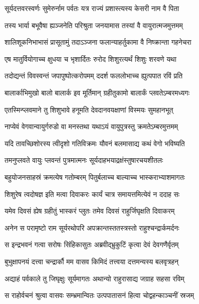 \twolineshloka
{सूर्यदत्तवरस्वर्णः सुमेरुर्नाम पर्वतः}
{यत्र राज्यं प्रशास्त्यस्य केसरी नाम वै पिता} %

\twolineshloka
{तस्य भार्या बभूवैषा ह्यञ्जनेति परिश्रुता}
{जनयामास तस्यां वै वायुरात्मजमुत्तमम्} %

\twolineshloka
{शालिशूकनिभाभासं प्रासूतामुं तदाऽञ्जना}
{फलान्याहर्तुकामा वै निष्क्रान्ता गहनेचरा} %

\twolineshloka
{एष मातुर्वियोगाच्च क्षुधया च भृशार्दितः}
{रुरोद शिशुरत्यर्थं शिशुः शरवणे यथा} %

\twolineshloka
{तदोद्यन्तं विवस्वन्तं जपापुष्पोत्करोपमम्}
{ददर्श फललोभाच्च ह्युत्पपात रविं प्रति} %

\twolineshloka
{बालार्काभिमुखो बालो बालार्क इव मूर्तिमान्}
{ग्रहीतुकामो बालार्कं प्लवतेऽम्बरमध्यगः} %

\twolineshloka
{एतस्मिन्प्लवमाने तु शिशुभावे हनूमति}
{देवदानवयक्षाणां विस्मयः सुमहानभूत्} %

\twolineshloka
{नाप्येवं वेगवान्वायुर्गरुडो वा मनस्तथा}
{यथाऽयं वायुपुत्रस्तु क्रमतेऽम्बरमुत्तमम्} %

\twolineshloka
{यदि तावच्छिशोरस्य त्वीदृशो गतिविक्रमः}
{यौवनं बलमासाद्य कथं वेगो भविष्यति} %

\twolineshloka
{तमनुप्लवते वायुः प्लवन्तं पुत्रमात्मनः}
{सूर्यदाहभयाद्रक्षंस्तुषारचयशीतलः} %

\twolineshloka
{बहुयोजनसाहस्रं क्रमत्येष गतोम्बरम्}
{पितुर्बलाच्च बाल्याच्च भास्कराभ्याशमागतः} %

\twolineshloka
{शिशुरेष त्वदोषज्ञ इति मत्वा दिवाकरः}
{कार्यं चात्र समायत्तमित्येवं न ददाह सः} %

\twolineshloka
{यमेव दिवसं ह्येष ग्रहीतुं भास्करं प्लुतः}
{तमेव दिवसं राहुर्जिघृक्षति दिवाकरम्} %

\twolineshloka
{अनेन स परामृष्टो राम सूर्यरथोपरि}
{अपक्रान्तस्ततस्त्रस्तो राहुश्चन्द्रार्कमर्दनः} %

\twolineshloka
{स इन्द्रभवनं गत्वा सरोषः सिंहिकासुतः}
{अब्रवीद्भ्रुकुटिं कृत्वा देवं देवगणैर्वृतम्} %

\twolineshloka
{बुभुक्षापनयं दत्त्वा चन्द्रार्कौ मम वासव}
{किमिदं तत्त्वया दत्तमन्यस्य बलवृत्रहन्} %

\twolineshloka
{अद्याहं पर्वकाले तु जिघृक्षुः सूर्यमागतः}
{अथान्यो राहुरासाद्य जग्राह सहसा रविम्} %

\twolineshloka
{स राहोर्वचनं श्रुत्वा वासवः सम्भ्रमान्वितः}
{उत्पपातासनं हित्वा चोद्वहन्काञ्चनीं स्रजम्} %

